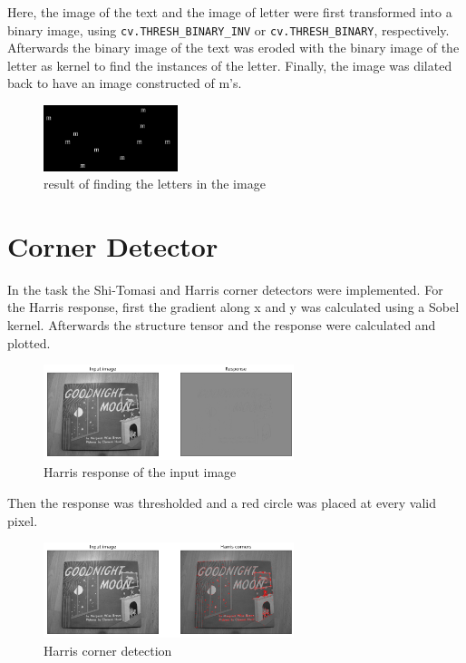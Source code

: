 \documentclass{article}
\begin{document}
    Here, the image of the text and the image of letter were first transformed into a binary image,
    using \verb|cv.THRESH_BINARY_INV| or \verb|cv.THRESH_BINARY|, respectively. Afterwards the binary image of the text was eroded with the binary image of the letter as kernel to find the instances of the letter.
    Finally, the image was dilated back to have an image constructed of m's.

    \begin{figure}[H]
        \centering
        \includegraphics[width = 0.35\textwidth]{text_recog_results.png}
        \caption{result of finding the letters in the image}
        \label{img:text_recog}
    \end{figure}

    \pagebreak

    \section{Corner Detector}

    In the task the Shi-Tomasi and Harris corner detectors were implemented. For the Harris response, first the gradient along x and y was calculated using a Sobel kernel.
    Afterwards the structure tensor and the response were calculated and plotted.

    \begin{figure}[H]
        \centering
        \includegraphics[width = 0.65\textwidth]{harris_response.png}
        \caption{Harris response of the input image}
        \label{img:harris_response}
    \end{figure}

    Then the response was thresholded and a red circle was placed at every valid pixel.

    \begin{figure}[H]
        \centering
        \includegraphics[width = 0.65\textwidth]{harris_before.png}
        \caption{Harris corner detection}
        \label{img:harris_before}
    \end{figure}    
\end{document}
